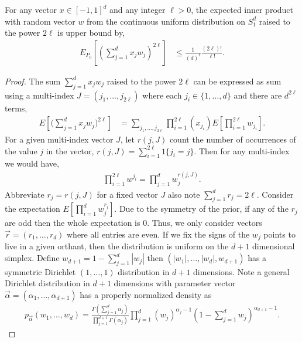 \documentclass[10pt,a4paper]{amsart}
\begin{document}
\begin{lemma} \label{cont_dir_lemma}
For any vector $x \in [-1,1]^{d}$ and any integer $\ell>0$, the expected inner product with random vector $w$ from the continuous uniform distribution on $S^{d}_{1}$ raised to the power $2\ell$ is upper bound by,
\begin{align}
    E_{P_{0}}[(\sum_{j=1}^{d}x_{j}w_{j})^{2\ell}]&\leq \frac{1}{(d)^{\ell}}\frac{(2\ell)!}{\ell!}.
\end{align}
    
\end{lemma}

\begin{proof}
The sum $\sum_{j=1}^{d}x_{j}w_{j}$ raised to the power $2\ell$ can be expressed as sum using a multi-index $J = (j_{1}, \ldots, j_{2\ell})$ where each $j_{i} \in \{1, \ldots, d\}$ and there are $d^{2\ell}$ terms,
\begin{align}
    E[\Big(\sum_{j=1}^{d}x_{j}w_{j} \Big)^{2\ell}]&= \sum_{j_{1},\ldots,j_{2\ell} }\prod_{i=1}^{2\ell}(x_{j_{i}})E[\prod_{i=1}^{2\ell}w_{j_{i}}].
\end{align}
For a given multi-index vector $J$, let $r(j, J)$ count the number of occurrences of the value $j$ in the vector, $r(j, J)= \sum_{i=1}^{2\ell}1\{j_{i} = j\}$. Then for any multi-index we would have,
\begin{align}
    \prod_{i=1}^{2\ell}w^{j_{i}} = \prod_{j=1}^{d}w_{j}^{r(j, J)}.
\end{align}
Abbreviate $r_{j} = r(j, J)$ for a fixed vector $J$ also note $\sum_{j=1}^{d}r_{j} = 2\ell$. Consider the expectation $E[\prod_{i=1}^{d}w_{j}^{r_{j}}]$. Due to the symmetry of the prior, if any of the $r_{j}$ are odd then the whole expectation is 0. Thus, we only consider vectors $\vec{r} = (r_{1}, \ldots, r_{d})$ where all entries are even.
If we fix the signs of the $w_{j}$ points to live in a given orthant, then the distribution is uniform on the $d+1$ dimensional simplex. Define $w_{d+1} = 1-\sum_{j=1}^{d}|w_{j}|$ then $(|w_{1}|, \ldots, |w_{d}|, w_{d+1})$ has a symmetric Dirichlet $(1, \ldots, 1)$ distribution in $d+1$ dimensions. Note a general Dirichlet distribution in $d+1$ dimensions with parameter vector $\vec{\alpha}=(\alpha_{1}, \ldots, \alpha_{d+1})$ has a properly normalized density as
\begin{align}
    p_{\vec{\alpha}}(w_{1}, \ldots, w_{d})=\frac{\Gamma(\sum_{j=1}^{d}\alpha_{j})}{\prod_{j=1}^{d+1}\Gamma(\alpha_{j})}\prod_{j=1}^{d}(w_{j})^{\alpha_{j}-1}(1-\sum_{j=1}^{d}w_{j})^{\alpha_{d+1}-1}.
\end{align}

\end{proof}
\end{document}
